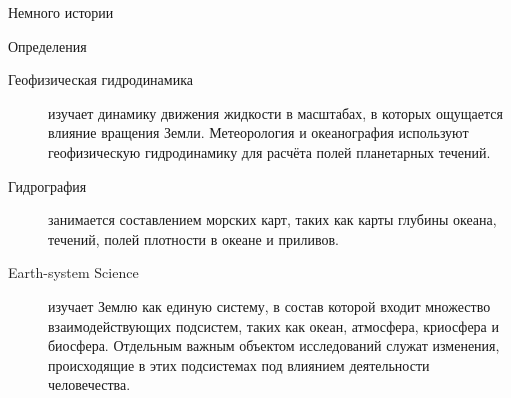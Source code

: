 \begin{chapter}{Немного истории}
\begin{section}{Определения}
\begin{description}
\item[Геофизическая гидродинамика] изучает динамику движения жидкости
в масштабах, в которых ощущается влияние вращения Земли. Метеорология и
океанография используют геофизическую гидродинамику для расчёта полей
планетарных течений.
%

\item[Гидрография] занимается составлением морских карт, таких как
карты глубины океана, течений, полей плотности в океане и приливов.
%

\item[Earth-system Science] изучает Землю как единую систему, в состав 
которой входит множество взаимодействующих подсистем, таких как океан, 
атмосфера, криосфера и биосфера. Отдельным важным объектом исследований
служат изменения, происходящие в этих подсистемах под влиянием деятельности
человечества.
%
\end{description}
\end{section}


\end{chapter}
